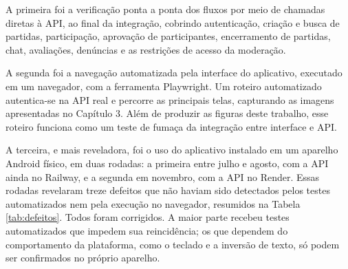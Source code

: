 \documentclass[a4paper, 12pt]{article}
\begin{document}
\begin{justify}
A primeira foi a verificação ponta a ponta dos fluxos por meio de chamadas diretas à API, ao final da integração, cobrindo autenticação, criação e busca de partidas, participação, aprovação de participantes, encerramento de partidas, chat, avaliações, denúncias e as restrições de acesso da moderação.

A segunda foi a navegação automatizada pela interface do aplicativo, executado em um navegador, com a ferramenta Playwright. Um roteiro automatizado autentica-se na API real e percorre as principais telas, capturando as imagens apresentadas no Capítulo 3. Além de produzir as figuras deste trabalho, esse roteiro funciona como um teste de fumaça da integração entre interface e API.

A terceira, e mais reveladora, foi o uso do aplicativo instalado em um aparelho Android físico, em duas rodadas: a primeira entre julho e agosto, com a API ainda no Railway, e a segunda em novembro, com a API no Render. Essas rodadas revelaram treze defeitos que não haviam sido detectados pelos testes automatizados nem pela execução no navegador, resumidos na Tabela \ref{tab:defeitos}. Todos foram corrigidos. A maior parte recebeu testes automatizados que impedem sua reincidência; os que dependem do comportamento da plataforma, como o teclado e a inversão de texto, só podem ser confirmados no próprio aparelho.


\end{justify}
\end{document}

